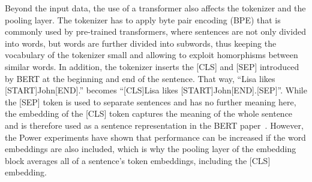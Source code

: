 Beyond the input data, the use of a transformer also affects the tokenizer and the pooling layer. The tokenizer has to apply byte pair encoding (BPE) that is commonly used by pre-trained transformers, where sentences are not only divided into words, but words are further divided into subwords, thus keeping the vocabulary of the tokenizer small and allowing to exploit homorphisms between similar words. In addition, the tokenizer inserts the [CLS] and [SEP] introduced by BERT at the beginning and end of the sentence. That way, ``Lisa likes [START]John[END].'' becomes ``[CLS]Lisa likes [START]John[END].[SEP]''. While the [SEP] token is used to separate sentences and has no further meaning here, the embedding of the [CLS] token captures the meaning of the whole sentence and is therefore used as a sentence representation in the BERT paper~\cite{Devlin2019BERTPO}. However, the Power experiments have shown that performance can be increased if the word embeddings are also included, which is why the pooling layer of the embedding block averages all of a sentence's token embeddings, including the [CLS] embedding.
